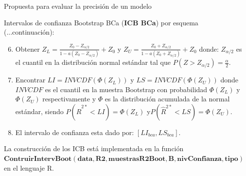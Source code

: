 \documentclass[serif, aspectratio=169]{beamer}
\begin{document}
\begin{frame}{Propuesta para evaluar la precisión de un modelo}
	
	
	Intervalos de confianza Bootstrap BCa (\textbf{ICB BCa}) por esquema (...continuación):
	
	\vspace{.2cm}
	
	\begin{enumerate}
		\setcounter{enumi}{5}
		
		\item Obtener {\large $Z_{L} = \frac{Z_{0} - Z_{\alpha/2}}{ 1- a ( Z_{0} - Z_{\alpha/2})} + Z_{0}  $}   y {\large $Z_{U} = \frac{Z_{0} + Z_{\alpha/2}}{ 1- a( Z_{0} + Z_{\alpha/2})} + Z_{0}  $}  donde: $Z_{\alpha /2}$ es el cuantil en la
		distribución normal estándar tal que $P(Z > Z_{\alpha / 2}) = \frac{\alpha}{2}$.
		
		
		\item Encontrar $LI = INVCDF( \Phi(Z_{L}))$ y $LS = INVCDF( \Phi(Z_{U}))$ donde $INVCDF$ es el cuantil en la muestra Bootstrap con probabilidad $ \Phi(Z_{L})$ y $ \Phi(Z_{U})$ respectivamente y $\Phi$ es la distribución acumulada de la normal estándar, siendo $P(\hat{R}^{2*} < LI) = \Phi(Z_{L})$ y$P(\hat{R}^{2*} < LS) = \Phi(Z_{U})$.
		
		\item El intervalo de confianza esta dado por: $[LI_{bca}, LS_{bca}]$.
	\end{enumerate}
	
	\vspace{0.3cm}
	La construcción de los ICB está implementada en la función $\mathbf{ContruirIntervBoot(data, R2, muestrasR2Boot, B, nivConfianza, tipo)}$ en el lenguaje R.
\end{frame}
\end{document}
